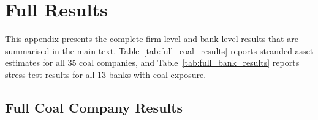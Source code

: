 
\section{Full Results}
\label{sec:appendix_results}

This appendix presents the complete firm-level and bank-level results that are summarised in the main text. Table~\ref{tab:full_coal_results} reports stranded asset estimates for all 35 coal companies, and Table~\ref{tab:full_bank_results} reports stress test results for all 13 banks with coal exposure.


\subsection{Full Coal Company Results}
\label{subsec:full_coal}

